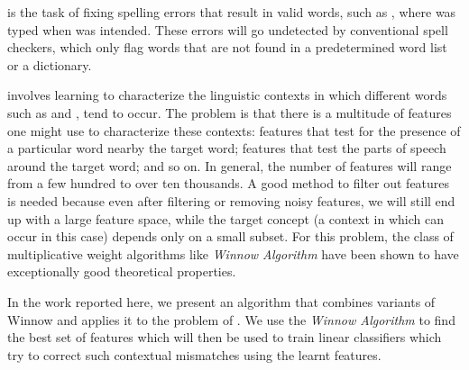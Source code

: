 
\textit{\projectTitle{}} is the task of fixing spelling errors that result in
valid words, such as , where 
was typed when  was intended. These errors will go undetected
by conventional spell checkers, which only flag words that are not found in a
predetermined word list or a dictionary.

\textit{\projectTitle{}} involves learning to characterize the linguistic
contexts in which different words such as  and
, tend to occur. The problem is that there is a multitude of
features one might use to characterize these contexts: features that test for
the presence of a particular word nearby the target word; features that test
the parts of speech around the target word; and so on. In general, the number
of features will range from a few hundred to over ten thousands. A good method
to filter out features is needed because even after filtering or removing noisy
features, we will still end up with a large feature space, while the target
concept (a context in which  can occur in this case) depends
only on a small subset. For this problem, the class of multiplicative weight
algorithms like \textit{Winnow Algorithm} have been shown to have exceptionally good
theoretical properties.

In the work reported here, we present an algorithm that combines variants of
Winnow and applies it to the problem of \textit{\projectTitle{}}. We use the
\textit{Winnow Algorithm} to find the best set of features which will then be used to
train linear classifiers which try to correct such contextual mismatches using
the learnt features.
